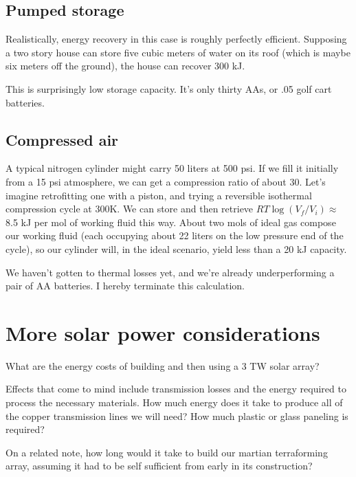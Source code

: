 \documentclass[12pt]{article}
\begin{document}

\subsection{Pumped storage}

Realistically, energy recovery in this case is roughly perfectly efficient. Supposing a two story house can store five cubic meters of water on its roof  (which is maybe six meters off the ground), the house can recover 300 kJ.

This is surprisingly low storage capacity. It's only thirty AAs, or .05 golf cart batteries.

\subsection{Compressed air}

A typical nitrogen cylinder might carry 50 liters at 500 psi. If we fill it initially from a 15 psi atmosphere, we can get a compression ratio of about 30. Let's imagine retrofitting one with a piston, and trying a reversible isothermal compression cycle at 300K. We can store and then retrieve \(RT\log(V_f/V_i) \approx \) 8.5 kJ per mol of working fluid this way. About two mols of ideal gas compose our working fluid (each occupying about 22 liters on the low pressure end of the cycle), so our cylinder will, in the ideal scenario, yield less than a 20 kJ capacity.

We haven't gotten to thermal losses yet, and we're already underperforming a pair of AA batteries. I hereby terminate this calculation.


\section{More solar power considerations}

What are the energy costs of building and then using a 3 TW solar array?

Effects that come to mind include transmission losses and the energy required to process the necessary materials. How much energy does it take to produce all of the copper transmission lines we will need? How much plastic or glass paneling is required?

On a related note, how long would it take to build our martian terraforming array, assuming it had to be self sufficient from early in its construction?
\end{document}
